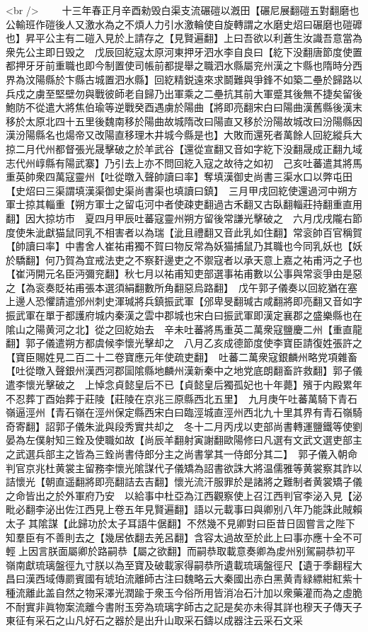 <br />
　　十三年春正月辛酉勑毁白渠支流碾磑以漑田【碾尼展翻磑五對翻磨也公輸班作磑後人又激水為之不煩人力引水激輪使自旋轉謂之水磨史炤曰碾磨也磑䃺也】昇平公主有二磑入見於上請存之【見賢遍翻】上曰吾欲以利蒼生汝識吾意當為衆先公主即日毁之　戊辰回紇寇太原河東押牙泗水李自良曰【紇下没翻唐節度使置都押牙牙前重職也即今制置使司帳前都提舉之職泗水縣屬兖州漢之卞縣也隋時分西界為汶陽縣於卞縣古城置泗水縣】回紇精鋭遠來求鬬難與爭鋒不如築二壘於歸路以兵戍之虜至堅壁勿與戰彼師老自歸乃出軍乘之二壘抗其前大軍蹙其後無不捷矣留後鮑防不從遣大將焦伯瑜等逆戰癸酉遇虜於陽曲【將即亮翻宋白曰陽曲漢舊縣後漢末移於太原北四十五里後魏南移於陽曲故城隋改曰陽直又移於汾陽故城改曰汾陽縣因漢汾陽縣名也煬帝又改陽直移理木井城今縣是也】大敗而還死者萬餘人回紇縱兵大掠二月代州都督張光晟擊破之於羊武谷【還從宣翻又音如字紇下没翻晟成正翻九域志代州崞縣有陽武寨】乃引去上亦不問回紇入寇之故待之如初　己亥吐蕃遣其將馬重英帥衆四萬寇靈州【吐從暾入聲帥讀曰率】奪填漢御史尚書三渠水口以弊屯田【史炤曰三渠謂填漢渠御史渠尚書渠也填讀曰鎮】　三月甲戌回紇使還過河中朔方軍士掠其輜重【朔方軍士之留屯河中者使疎吏翻過古禾翻又古臥翻輜莊持翻重直用翻】因大掠坊市　夏四月甲辰吐蕃寇靈州朔方留後常謙光擊破之　六月戊戌隴右節度使朱泚獻猫鼠同乳不相害者以為瑞【泚且禮翻又音此乳如住翻】常衮帥百官稱賀【帥讀曰率】中書舍人崔祐甫獨不賀曰物反常為妖猫捕鼠乃其職也今同乳妖也【妖於驕翻】何乃賀為宜戒法吏之不察姧邊吏之不禦寇者以承天意上嘉之祐甫沔之子也【崔沔開元名臣沔彌兖翻】秋七月以祐甫知吏部選事祐甫數以公事與常衮爭由是惡之【為衮奏貶祐甫張本選須絹翻數所角翻惡烏路翻】　戊午郭子儀奏以回紇猶在塞上邊人恐懼請遣邠州刺史渾瑊將兵鎮振武軍【邠卑旻翻瑊古咸翻將即亮翻又音如字振武軍在單于都護府城内秦漢之雲中郡城也宋白曰振武軍即漢定襄郡之盛樂縣也在隂山之陽黄河之北】從之回紇始去　辛未吐蕃將馬重英二萬衆寇鹽慶二州【重直龍翻】郭子儀遣朔方都虞候李懷光擊却之　八月乙亥成德節度使李寶臣請復姓張許之【寶臣賜姓見二百二十二卷寶應元年使疏吏翻】　吐蕃二萬衆寇銀麟州略党項雜畜【吐從暾入聲銀州漢西河郡圁隂縣地麟州漢新秦中之地党底朗翻畜許救翻】郭子儀遣李懷光擊破之　上悼念貞懿皇后不已【貞懿皇后獨孤妃也十年薨】殯于内殿累年不忍葬丁酉始葬于莊陵【莊陵在京兆三原縣西北五里】　九月庚午吐蕃萬騎下青石嶺逼涇州【青石嶺在涇州保定縣西宋白曰臨涇城直涇州西北九十里其界有青石嶺騎奇寄翻】詔郭子儀朱泚與段秀實共却之　冬十二月丙戌以吏部尚書轉運鹽鐵等使劉晏為左僕射知三銓及使職如故【尚辰羊翻射寅謝翻歐陽修曰凡選有文武文選吏部主之武選兵部主之皆為三銓尚書侍郎分主之尚書掌其一侍郎分其二】　郭子儀入朝命判官京兆杜黄裳主留務李懷光隂謀代子儀矯為詔書欲誅大將温儒雅等黄裳察其詐以詰懷光【朝直遥翻將即亮翻詰去吉翻】懷光流汗服罪於是諸將之難制者黄裳矯子儀之命皆出之於外軍府乃安　以給事中杜亞為江西觀察使上召江西判官李泌入見【泌毗必翻李泌出佐江西見上卷五年見賢遍翻】語以元載事曰與卿别八年乃能誅此賊賴太子其隂謀【此歸功於太子耳語牛倨翻】不然幾不見卿對曰臣昔日固嘗言之陛下知羣臣有不善則去之【幾居依翻去羌呂翻】含容太過故至於此上曰事亦應十全不可輕上因言朕面屬卿於路嗣恭【屬之欲翻】而嗣恭取載意奏卿為䖍州别駕嗣恭初平嶺南獻琉璃盤徑九寸朕以為至寶及破載家得嗣恭所遺載琉璃盤徑尺【遺于季翻程大昌曰漢西域傳罽賓國有琥珀流離師古注曰魏略云大秦國出赤白黑黄青緑縹紺紅紫十種流離此盖自然之物采澤光潤踰于衆玉今俗所用皆消冶石汁加以衆藥灌而為之虛脆不耐實非眞物案流離今書附玉旁為琉璃字師古之記是矣亦未得其詳也穆天子傳天子東征有采石之山凡好石之器於是出升山取采石鑄以成器注云采石文采